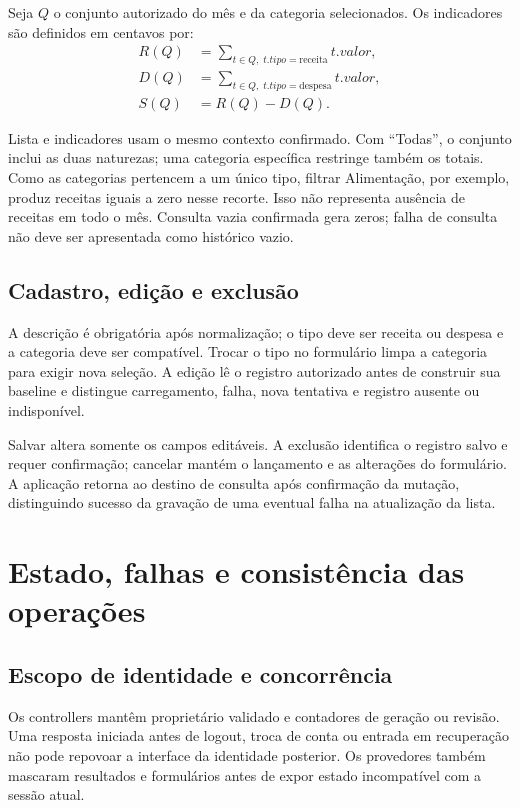 \documentclass[
    12pt,
    oneside,
    a4paper,
    brazil
]{abntex2}
\begin{document}
Seja $Q$ o conjunto autorizado do mês e da categoria selecionados. Os indicadores são definidos em centavos por:
\begin{align}
R(Q) &= \sum_{t \in Q,\;t.tipo=\mathrm{receita}} t.valor,\\
D(Q) &= \sum_{t \in Q,\;t.tipo=\mathrm{despesa}} t.valor,\\
S(Q) &= R(Q)-D(Q).
\end{align}

Lista e indicadores usam o mesmo contexto confirmado. Com ``Todas'', o conjunto inclui as duas naturezas; uma categoria específica restringe também os totais. Como as categorias pertencem a um único tipo, filtrar Alimentação, por exemplo, produz receitas iguais a zero nesse recorte. Isso não representa ausência de receitas em todo o mês. Consulta vazia confirmada gera zeros; falha de consulta não deve ser apresentada como histórico vazio.

\section{Cadastro, edição e exclusão}

A descrição é obrigatória após normalização; o tipo deve ser receita ou despesa e a categoria deve ser compatível. Trocar o tipo no formulário limpa a categoria para exigir nova seleção. A edição lê o registro autorizado antes de construir sua baseline e distingue carregamento, falha, nova tentativa e registro ausente ou indisponível.

Salvar altera somente os campos editáveis. A exclusão identifica o registro salvo e requer confirmação; cancelar mantém o lançamento e as alterações do formulário. A aplicação retorna ao destino de consulta após confirmação da mutação, distinguindo sucesso da gravação de uma eventual falha na atualização da lista.

\chapter{Estado, falhas e consistência das operações}

\section{Escopo de identidade e concorrência}

Os controllers mantêm proprietário validado e contadores de geração ou revisão. Uma resposta iniciada antes de logout, troca de conta ou entrada em recuperação não pode repovoar a interface da identidade posterior. Os provedores também mascaram resultados e formulários antes de expor estado incompatível com a sessão atual.
\end{document}
